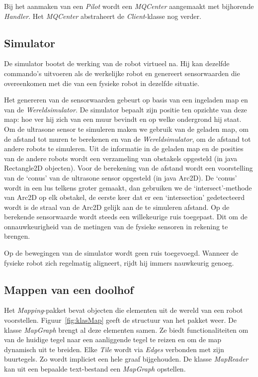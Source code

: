 \documentclass[eind]{penoverslag}
\begin{document}
Bij het aanmaken van een \textit{Pilot} wordt een \textit{MQCenter} aangemaakt met bijhorende \textit{Handler}. Het \textit{MQCenter} abstraheert de \textit{Client}-klasse nog verder.



\subsection{Simulator} 
\label{ssec:Sim}
De simulator bootst de werking van de robot virtueel na.
Hij kan dezelfde commando's uitvoeren als de werkelijke robot en
genereert sensorwaarden die overeenkomen met die van een fysieke
robot in dezelfde situatie.

Het genereren van de sensorwaarden gebeurt op basis van een ingeladen
map en van de \textit{Wereldsimulator}.
De simulator bepaalt zijn positie ten opzichte van deze map:
hoe ver hij zich van een muur bevindt en op welke ondergrond hij staat.
Om de ultrasone sensor te simuleren maken we gebruik van de geladen map,
om de afstand tot muren te berekenen en van de \textit{Wereldsimulator},
om de afstand tot andere robots te simuleren.
Uit de informatie in de geladen map en de posities van de andere robots
wordt een verzameling van obstakels opgesteld (in java Rectangle2D objecten).
Voor de berekening van de afstand wordt een voorstelling van de `conus'
van de ultrasone sensor opgesteld (in java Arc2D).
De `conus' wordt in een lus telkens groter gemaakt, dan gebruiken we de
`intersect'-methode van Arc2D op elk obstakel, de eerste keer dat er een
`intersection' gedetecteerd wordt is de straal van de Arc2D gelijk aan
de te simuleren afstand.
Op de berekende sensorwaarde wordt steeds een willekeurige ruis toegepast.
Dit om de onnauwkeurigheid van de metingen van de fysieke sensoren in
rekening te brengen.

Op de bewegingen van de simulator wordt geen ruis toegevoegd.
Wanneer de fysieke robot zich regelmatig aligneert,
rijdt hij immers nauwkeurig genoeg.

\subsection{Mappen van een doolhof}
\label{ssec:Mapping}
Het \textit{Mapping}-pakket bevat objecten die elementen uit de wereld van een robot voorstellen. Figuur~\ref{fig:klasMap} geeft de structuur van het pakket weer. De klasse \textit{MapGraph} brengt al deze elementen samen. Ze biedt functionaliteiten om van de huidige tegel naar een aanliggende tegel te reizen en om de map dynamisch uit te breiden. Elke \textit{Tile} wordt via \textit{Edges} verbonden met zijn buurtegels. Zo wordt impliciet een hele graaf bijgehouden. De klasse \textit{MapReader} kan uit een bepaalde text-bestand een \textit{MapGraph} opstellen.\\
\end{document}
